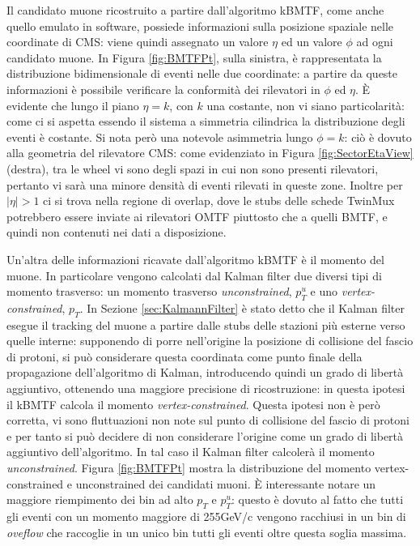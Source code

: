 Il candidato muone ricostruito a partire dall'algoritmo kBMTF, come anche quello emulato in software, possiede informazioni sulla posizione spaziale nelle coordinate di CMS: viene quindi assegnato un valore $\eta$ ed un valore $\phi$ ad ogni candidato muone. In Figura \ref{fig:BMTFPt}, sulla sinistra, è rappresentata la distribuzione bidimensionale di eventi nelle due coordinate: a partire da queste informazioni è possibile verificare la conformità dei rilevatori in $\phi$ ed $\eta$. È evidente che lungo il piano $\eta = k$, con $k$ una costante, non vi siano particolarità: come ci si aspetta essendo il sistema a simmetria cilindrica la distribuzione degli eventi è costante. Si nota però una notevole asimmetria lungo $\phi = k$: ciò è dovuto alla geometria del rilevatore CMS: come evidenziato in Figura \ref{fig:SectorEtaView} (destra), tra le wheel vi sono degli spazi in cui non sono presenti rilevatori, pertanto vi sarà una minore densità di eventi rilevati in queste zone. Inoltre per $|\eta| > 1$ ci si trova nella regione di overlap, dove le stubs delle schede TwinMux potrebbero essere inviate ai rilevatori OMTF piuttosto che a quelli BMTF, e quindi non contenuti nei dati a disposizione.

Un'altra delle informazioni ricavate dall'algoritmo kBMTF è il momento del muone. In particolare vengono calcolati dal Kalman filter due diversi tipi di momento trasverso: un momento trasverso \textit{unconstrained}, $p_T^u$ e uno \textit{vertex-constrained}, $p_T$. In Sezione \ref{sec:KalmannFilter} è stato detto che il Kalman filter esegue il tracking del muone a partire dalle stubs delle stazioni più esterne verso quelle interne: supponendo di porre nell'origine la posizione di collisione del fascio di protoni, si può considerare questa coordinata come punto finale della propagazione dell'algoritmo di Kalman, introducendo quindi un grado di libertà aggiuntivo, ottenendo una maggiore precisione di ricostruzione: in questa ipotesi il kBMTF calcola il momento \textit{vertex-constrained}. \newline
Questa ipotesi non è però corretta, vi sono fluttuazioni non note sul punto di collisione del fascio di protoni e per tanto si può decidere di non considerare l'origine come un grado di libertà aggiuntivo dell'algoritmo. In tal caso il Kalman filter calcolerà il momento \textit{unconstrained}. 
Figura \ref{fig:BMTFPt} mostra la distribuzione del momento vertex-constrained e unconstrained dei candidati muoni. È interessante notare un maggiore riempimento dei bin ad alto $p_T$ e $p_T^u$: questo è dovuto al fatto che tutti gli eventi con un momento maggiore di 255GeV/c vengono racchiusi in un bin di \textit{oveflow} che raccoglie in un unico bin tutti gli eventi oltre questa soglia massima.


